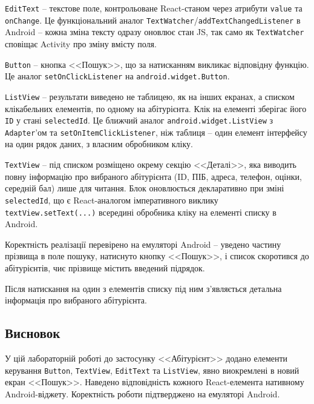 \documentclass[14pt, a4paper]{extreport}
\begin{document}
	\texttt{EditText} -- текстове поле, контрольоване React-станом через атрибути \texttt{value} та \texttt{onChange}. Це функціональний аналог \texttt{TextWatcher}/\texttt{addTextChangedListener} в Android -- кожна зміна тексту одразу оновлює стан JS, так само як \texttt{TextWatcher} сповіщає Activity про зміну вмісту поля.
	
	\texttt{Button} -- кнопка <<Пошук>>, що за натисканням викликає відповідну функцію. Це аналог \texttt{setOnClickListener} на \texttt{android.widget.Button}.
	
	\texttt{ListView} -- результати виведено не таблицею, як на інших екранах, а списком клікабельних елементів, по одному на абітурієнта. Клік на елементі зберігає його \texttt{ID} у стані \texttt{selectedId}. Це ближчий аналог \texttt{android.widget.ListView} з \texttt{Adapter}'ом та \texttt{setOnItemClickListener}, ніж таблиця -- один елемент інтерфейсу на один рядок даних, з власним обробником кліку.
	
	\texttt{TextView} -- під списком розміщено окрему секцію <<Деталі>>, яка виводить повну інформацію про вибраного абітурієнта (ID, ПІБ, адреса, телефон, оцінки, середній бал) лише для читання. Блок оновлюється декларативно при зміні \texttt{selectedId}, що є React-аналогом імперативного виклику \texttt{textView.setText(...)} всередині обробника кліку на елементі списку в Android.
	
	
	Коректність реалізації перевірено на емуляторі Android -- уведено частину прізвища в поле пошуку, натиснуто кнопку <<Пошук>>, і список скоротився до абітурієнтів, чиє прізвище містить введений підрядок.
	
	
	Після натискання на один з елементів списку під ним з'являється детальна інформація про вибраного абітурієнта.
	

	\subsection*{Висновок}

	У цій лабораторній роботі до застосунку <<Абітурієнт>> додано елементи керування \texttt{Button}, \texttt{TextView}, \texttt{EditText} та \texttt{ListView}, явно виокремлені в новий екран <<Пошук>>. Наведено відповідність кожного React-елемента нативному Android-віджету. Коректність роботи підтверджено на емуляторі Android.
\end{document}
